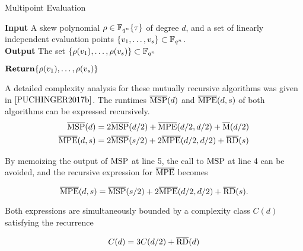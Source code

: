 \begin{algorithm}
\caption{Multipoint Evaluation \cite{PUCHINGER2017b}}
\label{mpe1}
\hspace*{\algorithmicindent} \textbf{Input} A skew polynomial $\rho \in \mathbb{F}_{q^n}\{\tau \}$ of degree $d$, and a set of linearly independent evaluation points $\{ v_1, \ldots, v_s \} \subset \mathbb{F}_{q^n}$. \\
 \hspace*{\algorithmicindent} \textbf{Output} The set $\{ \rho(v_1), \ldots, \rho(v_s) \} \subset  \mathbb{F}_{q^n}$ \\
 \begin{algorithmic}[1]
            \State $\textnormal{\textbf{Return}} \{\rho(v_1), \ldots, \rho(v_s) \}$
        
      \EndIf
 \end{algorithmic}
\end{algorithm}

A detailed complexity analysis for these mutually recursive algorithms was given in $\cite{PUCHINGER2017b}$. The runtimes $\overline{\textnormal{MSP}}(d)$ and $\overline{\textnormal{MPE}}(d, s)$ of both algorithms can be expressed recursively.
\begin{align*}
    \overline{\textnormal{MSP}}(d) & = 2\overline{\textnormal{MSP}}(d/2) + \overline{\textnormal{MPE}}(d/2, d/2) + \overline{\textnormal{M}}(d/2) \\
    \overline{\textnormal{MPE}}(d, s) & = 2\overline{\textnormal{MSP}}(s/2) + 2\overline{\textnormal{MPE}}(d/2, d/2) + \overline{\textnormal{RD}}(s)
\end{align*}

By memoizing the output of $\textnormal{MSP}$ at line 5, the call to $\textnormal{MSP}$ at line 4 can be avoided, and the recursive expression for $\overline{\textnormal{MPE}}$ becomes

\begin{equation*}
    \overline{\textnormal{MPE}}(d, s) = \overline{\textnormal{MSP}}(s/2) + 2\overline{\textnormal{MPE}}(d/2, d/2) + \overline{\textnormal{RD}}(s).
\end{equation*}

Both expressions are simultaneously bounded by a complexity class $C(d)$ satisfying the recurrence

\begin{equation*}
    C(d) = 3C(d/2) + \overline{\textnormal{RD}}(d)
\end{equation*}

